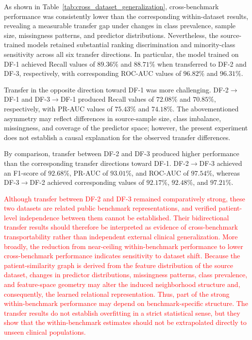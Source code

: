 \documentclass[pdflatex,sn-mathphys-num]{sn-jnl}%
\theoremstyle{thmstyleone}%
\theoremstyle{thmstyletwo}%
\theoremstyle{thmstylethree}%
\begin{document}
\endgroup

 {
As shown in Table~\ref{tab:cross_dataset_generalization}, cross-benchmark
performance was consistently lower than the corresponding within-dataset
results, revealing a measurable transfer gap under changes in class
prevalence, sample size, missingness patterns, and predictor distributions.
Nevertheless, the source-trained models retained substantial ranking
discrimination and minority-class sensitivity across all six transfer
directions. In particular, the model trained on DF-1 achieved Recall values
of \(89.36\%\) and \(88.71\%\) when transferred to DF-2 and DF-3,
respectively, with corresponding ROC-AUC values of \(96.82\%\) and
\(96.31\%\).
}

 {
Transfer in the opposite direction toward DF-1 was more challenging.
DF-2\(\rightarrow\)DF-1 and DF-3\(\rightarrow\)DF-1 produced Recall values
of \(72.08\%\) and \(70.85\%\), respectively, with PR-AUC values of
\(75.43\%\) and \(74.18\%\). The abovementioned asymmetry may reflect
differences in source-sample size, class imbalance, missingness, and coverage
of the predictor space; however, the present experiment does not establish a
causal explanation for the observed transfer differences.
}

{
By comparison, transfer between DF-2 and DF-3 produced higher performance
than the corresponding transfer directions toward DF-1.
DF-2\(\rightarrow\)DF-3 achieved an F1-score of \(92.68\%\), PR-AUC of
\(93.01\%\), and ROC-AUC of \(97.54\%\), whereas
DF-3\(\rightarrow\)DF-2 achieved corresponding values of \(92.17\%\),
\(92.48\%\), and \(97.21\%\).
}

\textcolor{red}{
Although transfer between DF-2 and DF-3 remained comparatively strong,
these two datasets are related public benchmark representations, and verified
patient-level independence between them cannot be established. Their
bidirectional transfer results should therefore be interpreted as evidence of
cross-benchmark transportability rather than independent external clinical
generalization. More broadly, the reduction from near-ceiling
within-benchmark performance to lower cross-benchmark performance indicates
sensitivity to dataset shift. Because the patient-similarity graph is derived
from the feature distribution of the source dataset, changes in predictor
distributions, missingness patterns, class prevalence, and feature-space
geometry may alter the induced neighborhood structure and, consequently, the
learned relational representation. Thus, part of the strong within-benchmark
performance may depend on benchmark-specific structure. The transfer results
do not establish overfitting in a strict statistical sense, but they show that
the within-benchmark estimates should not be extrapolated directly to unseen
clinical populations.
}
\end{document}
